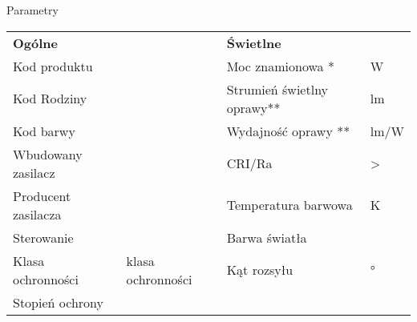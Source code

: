\documentclass[12pt,twoside]{article}
\begin{document}
{\begin{tcolorbox}[frame code={} %
    center title,
    valign=center,
    left=0pt,
    right=0pt,
    top=0pt,
    bottom=0pt,
    colback=yellow,
    width=250pt,
    height=31pt,
    enlarge left by=-4cm,
    boxsep=5pt,
    arc=15pt,
 	outer arc=0pt]\hspace{3cm} \large Parametry
\end{tcolorbox}
\begin{table}[H]
\centering
\begin{scriptsize} %
\begin{tabularx}{\textwidth}{lllX}
\textbf{Ogólne}                             &          				  		& \textbf{Świetlne}                                     &            			       				\\  
Kod produktu                            	& \kod        					& Moc znamionowa *                                     	& \p {} W       			       			\\ 
Kod Rodziny                            		& \rodzina      				& Strumień świetlny oprawy**                            &\flux {} lm         			       		\\ 
Kod barwy                          			& \kodbarwy       				& Wydajność oprawy **                                   & \wyd	{} lm/W         			      		\\  
Wbudowany zasilacz                          & \psu      					& CRI/Ra                                     			& >\cri          			       			\\ 
Producent zasilacza                         & \ppsu		    				& Temperatura barwowa                                   & \cct {} K           			       		\\ 
Sterowanie                           		& \sterowanie    				& Barwa światła                                     	& \barwa         			       			\\ 
Klasa ochronności                      		& \klasa {} klasa ochronności	& Kąt rozsyłu                                   		&\pled {}°     		       				\\ 
Stopień ochrony                             & \IP      				  		&                                       				&            			       				\\ 

\end{tabularx}
\end{scriptsize}
\end{table}}
\end{document}
